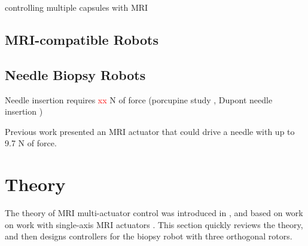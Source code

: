 \documentclass[letterpaper, 10 pt]{IEEEtran}
\begin{document}
 controlling multiple capsules with MRI\cite{Vartholomeos2012}
   
\subsection{MRI-compatible Robots}
   
\subsection{Needle Biopsy Robots}
Needle insertion requires \textcolor{red}{xx} N of force (porcupine study \cite{Cho26122012}, Dupont needle insertion \cite{Mahvash2010})
   
Previous work presented an MRI actuator that could drive a needle with up to 9.7 N  of force\cite{Felfoul2014}.
   

   


\section{Theory}\label{sec:Theory}

The theory of MRI multi-actuator control was introduced in \cite{Becker2014}, and based on work on work with single-axis MRI actuators \cite{Bergeles2013,Vartholomeos2011}. This section quickly reviews the theory, and then designs controllers for the biopsy robot with three orthogonal rotors.
\end{document}
